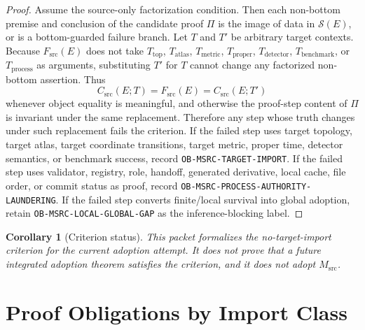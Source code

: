 \documentclass[11pt]{article}
\newcommand{\Msrc}{M_{\mathrm{src}}}
\newcommand{\Csrc}{C_{\mathrm{src}}}
\newcommand{\Fsrc}{F_{\mathrm{src}}}
\newcommand{\Tctx}{T}
\newcommand{\TopT}{T_{\mathrm{top}}}
\newcommand{\AtlasT}{T_{\mathrm{atlas}}}
\newcommand{\MetricT}{T_{\mathrm{metric}}}
\newcommand{\ProperT}{T_{\mathrm{proper}}}
\newcommand{\DetectorT}{T_{\mathrm{detector}}}
\newcommand{\BenchmarkT}{T_{\mathrm{benchmark}}}
\newcommand{\ProcessT}{T_{\mathrm{process}}}
\newtheorem{corollary}{Corollary}
\begin{document}
\begin{proof}
Assume the source-only factorization condition. Then each non-bottom premise
and conclusion of the candidate proof \(\Pi\) is the image of data in
\(\mathcal{S}(E)\), or is a bottom-guarded failure branch. Let \(\Tctx\) and
\(\Tctx'\) be arbitrary target contexts. Because \(\Fsrc(E)\) does not take
\(\TopT\), \(\AtlasT\), \(\MetricT\), \(\ProperT\), \(\DetectorT\),
\(\BenchmarkT\), or \(\ProcessT\) as arguments, substituting \(\Tctx'\) for
\(\Tctx\) cannot change any factorized non-bottom assertion. Thus
\[
  \Csrc(E;\Tctx)=\Fsrc(E)=\Csrc(E;\Tctx')
\]
whenever object equality is meaningful, and otherwise the proof-step content
of \(\Pi\) is invariant under the same replacement. Therefore any step whose
truth changes under such replacement fails the criterion. If the failed step
uses target topology, target atlas, target coordinate transitions, target
metric, proper time, detector semantics, or benchmark success, record
\texttt{OB-MSRC-TARGET-IMPORT}. If the failed step uses validator, registry,
role, handoff, generated derivative, local cache, file order, or commit status
as proof, record \texttt{OB-MSRC-PROCESS-AUTHORITY-LAUNDERING}. If the failed
step converts finite/local survival into global adoption, retain
\texttt{OB-MSRC-LOCAL-GLOBAL-GAP} as the inference-blocking label.
\end{proof}

\begin{corollary}[Criterion status]
This packet formalizes the no-target-import criterion for the current adoption
attempt. It does not prove that a future integrated adoption theorem satisfies
the criterion, and it does not adopt \(\Msrc\).
\end{corollary}

\section{Proof Obligations by Import Class}
\end{document}

